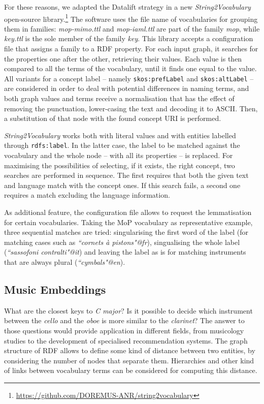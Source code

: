 \documentclass{article}
\begin{document}
For these reasons, we adapted the Datalift strategy in a new \textit{String2Vocabulary} open-source library.\footnote{
\url{https://github.com/DOREMUS-ANR/string2vocabulary}
} The software uses the file name of vocabularies for grouping them in families: \textit{mop-mimo.ttl} and \textit{mop-iaml.ttl} are part of the family \textit{mop}, while \textit{key.ttl} is the sole member of the family \textit{key}.
This library accepts a configuration file that assigns a family to a RDF property. For each input graph, it searches for the properties one after the other, retrieving their values. Each value is then compared to all the terms of the vocabulary, until it finds one equal to the value. All variants for a concept label -- namely \texttt{skos:prefLabel} and \texttt{skos:altLabel} -- are considered in order to deal with potential differences in naming terms, and both graph values and terms receive a normalisation that has the effect of removing the punctuation, lower-casing the text and decoding it to ASCII. Then, a substitution of that node with the found concept URI is performed.

\textit{String2Vocabulary} works both with literal values and with entities labelled through \texttt{rdfs:label}. In the latter case, the label to be matched against the vocabulary and the whole node -- with all its properties -- is replaced.
For maximising the possibilities of selecting, if it exists, the right concept, two searches are performed in sequence. The first requires that both the given text and language match with the concept ones. If this search fails, a second one requires a match excluding the language information.

As additional feature, the configuration file allows to request the lemmatisation for certain vocabularies. Taking the MoP vocabulary as representative example, three sequential matches are tried: singularising the first word of the label (for matching cases such as \textit{``cornets \`a pistons"@fr}), singualising the whole label (\textit{``sassofoni contralti"@it}) and leaving the label as is for matching instruments that are always plural (\textit{``cymbals"@en}). 

\subsection{Music Embeddings}
What are the closest keys to \textit{C major}? Is it possible to decide which instrument between the \textit{cello} and the \textit{oboe} is more similar to the \textit{clarinet}? The answer to those questions would provide application in different fields, from musicology studies to the development of specialised recommendation systems. The graph structure of RDF allows to define some kind of distance between two entities, by considering the number of nodes that separate them. Hierarchies and other kind of links between vocabulary terms can be considered for computing this distance.
\end{document}
